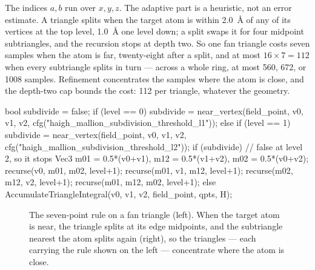 \documentclass[11pt]{article}
\begin{document}
The indices \(a,b\) run over
\(x,y,z\). The adaptive part is a heuristic, not an error estimate. A triangle splits when
the target atom is within \SI{2.0}{\angstrom} of any of its vertices at the top level,
\SI{1.0}{\angstrom} one level down; a split swaps it for four midpoint subtriangles, and
the recursion stops at depth two. So one fan triangle costs seven samples when the atom is
far, twenty-eight after a split, and at most \(16\times7 = 112\) when every subtriangle
splits in turn --- across a whole ring, at most 560, 672, or 1008 samples. Refinement
concentrates the samples where the atom is close, and the depth-two cap bounds the cost:
112 per triangle, whatever the geometry.

\begin{codebox}
bool subdivide = false;
if      (level == 0) subdivide = near_vertex(field_point, v0, v1, v2,
                                    cfg("haigh_mallion_subdivision_threshold_l1"));
else if (level == 1) subdivide = near_vertex(field_point, v0, v1, v2,
                                    cfg("haigh_mallion_subdivision_threshold_l2"));
if (subdivide) {                       // false at level 2, so it stops
    Vec3 m01 = 0.5*(v0+v1), m12 = 0.5*(v1+v2), m02 = 0.5*(v0+v2);
    recurse(v0,  m01, m02, level+1);   recurse(m01, v1,  m12, level+1);
    recurse(m02, m12, v2,  level+1);   recurse(m01, m12, m02, level+1);
} else {
    AccumulateTriangleIntegral(v0, v1, v2, field_point, qpts, H);
}
\end{codebox}

\begin{figure}[ht]
\centering
{}
\hspace{2.5em}
\caption{The seven-point rule on a fan triangle (left). When the target atom is near,
the triangle splits at its edge midpoints, and the subtriangle nearest the atom splits
again (right), so the triangles --- each carrying the rule shown on the left ---
concentrate where the atom is close.}
\end{figure}
\end{document}
